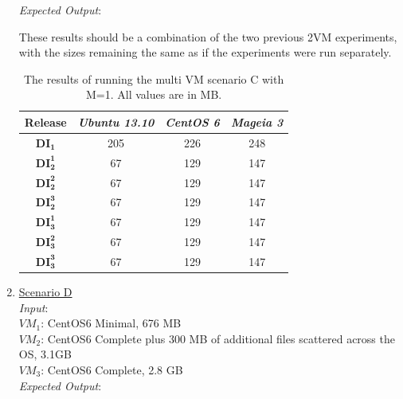 \begin{enumerate}
\textit{Expected Output}:


These results should be a combination of the two previous 2VM experiments, with the sizes remaining the same as if the experiments were run separately.
\begin{table}[h]
\centering

    \begin{tabular}{| c | c | c | c|}
    \hline
    \bfseries Release & \itshape Ubuntu 13.10 & \itshape CentOS 6 & \itshape Mageia 3\\ \hline
    \bfseries $\boldsymbol{DI_1}$ & 205 & 226 & 248\\ \hline
    \bfseries $\boldsymbol{DI_2^1}$ & 67 & 129 & 147\\ \hline 
\bfseries $\boldsymbol{DI_2^2}$ & 67 & 129 & 147\\ \hline 
\bfseries $\boldsymbol{DI_2^3}$ & 67 & 129 & 147\\ \hline 
\bfseries $\boldsymbol{DI_3^1}$  & 67 & 129 & 147\\ \hline 
\bfseries $\boldsymbol{DI_3^2}$ & 67 & 129 & 147\\ \hline 
\bfseries $\boldsymbol{DI_3^3}$ & 67 & 129 & 147\\ \hline 
    \end{tabular}
\caption{The results of running the multi VM scenario C with M=1. All values are in MB.}
\label{table:multiscenarioc}
\end{table}


\item \underline{Scenario D}\\
\textit{Input}:\\

$VM_1$: CentOS6 Minimal, 676 MB\\
$VM_2$: CentOS6 Complete plus 300 MB of additional files scattered across the OS, 3.1GB\\
$VM_3$: CentOS6 Complete, 2.8 GB\\

\textit{Expected Output}:



\end{enumerate}
